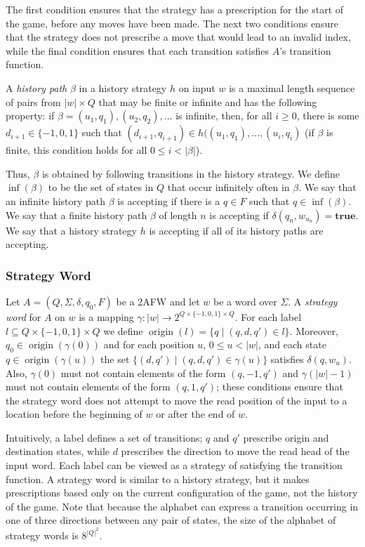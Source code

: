 \documentclass{lmcs}
\theoremstyle{definition}
\DeclareMathOperator{\?}{?}
\DeclareMathOperator{\origin}{origin}
\begin{document}
The first condition ensures that the strategy has a prescription for the start of the game, before any moves have been made.
The next two conditions ensure that the strategy does not prescribe a move that would lead to an invalid index,
while the final condition ensures that each transition satisfies $A$'s transition function.

A \textit{history path} $\beta$ in a history strategy $h$ on input $w$ is a maximal length sequence of pairs from $|w| \times Q$
that may be finite or infinite and has the following property: if $\beta = (u_1,q_1), (u_2,q_2), \ldots$ is infinite, then,
for all $i \geq 0$, there is some $d_{i+1} \in \{-1,0,1 \}$ such that $(d_{i+1},q_{i+1}) \in h((u_1,q_1),\ldots,(u_i,q_i)$
(if $\beta$ is finite, this condition holds for all $0 \leq i < |\beta|$).

Thus, $\beta$ is obtained by following transitions in the history strategy.
We define $\inf(\beta)$ to be the set of states in $Q$ that occur infinitely often in $\beta$.
We say that an infinite history path $\beta$ is accepting if there is a $q \in F$ such that $q \in \inf(\beta)$.
We say that a finite history path $\beta$ of length $n$ is accepting if $\delta(q_n, w_{u_n}) = \textbf{true}$. We say that a history strategy
$h$ is accepting if all of its history paths are accepting.



\subsubsection{Strategy Word}

Let $A = (Q,\Sigma,\delta,q_0,F)$ be a 2AFW and let $w$ be a word over $\Sigma$. A \textit{strategy word} for $A$ on $w$ is a mapping $\gamma : |w| \rightarrow 2^{Q \times \{-1,0,1\} \times Q}$.
For each label $l \subseteq Q \times \{-1,0,1\} \times Q$ we define $\origin(l) = \{ q \mid (q,d,q') \in l \}$. Moreover, $q_0 \in \origin(\gamma(0))$ and for each position $u$, $0 \leq u < |w|$, and each state $q \in \origin(\gamma(u))$ the set $\{ (d,q') \mid (q,d,q') \in \gamma(u) \}$ satisfies $\delta(q, w_u)$. Also, $\gamma(0)$ must not contain elements of the form $(q,-1,q')$ and $\gamma(|w|-1)$ must not contain elements of the form $(q,1,q')$; these conditions ensure that the strategy word does not attempt to move the read position of the input to a location before the beginning of $w$ or after the end of $w$.

Intuitively, a label defines a set of transitions; $q$ and $q'$ prescribe origin and destination states, while $d$ prescribes the direction to move the read head of the input word. Each label can be viewed as a strategy of satisfying the transition function. A strategy word is similar to a history strategy, but it makes prescriptions based only on the current configuration of the game, not the history of the game. Note that because the alphabet can express a transition occurring in one of three directions between any pair of states, the size of the alphabet of strategy words is $8^{|Q|^2}$.
\end{document}
